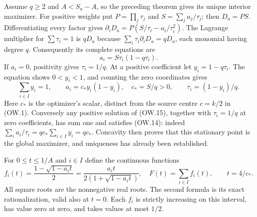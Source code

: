 Assume $q\ge2$ and $A<S_a-A$, so the preceding theorem gives its
unique interior maximizer. For positive weights put
$P=\prod_j\tau_j$ and $S=\sum_j a_j/\tau_j$; then $D_a=PS$.
Differentiating every factor gives
$\partial_iD_a=P(S/\tau_i-a_i/\tau_i^2)$.
The Lagrange multiplier for $\sum\tau_i=1$ is $qD_a$ because
$\sum_i\tau_i\partial_iD_a=qD_a$, each monomial having degree $q$.
Consequently its complete equations are
\[
 a_i=S\tau_i(1-q\tau_i).                                \tag{OW.14}
\]
If $a_i=0$, positivity gives $\tau_i=1/q$. At a positive
coefficient let $y_i=1-q\tau_i$. The equation shows
$0<y_i<1$, and counting the zero coordinates gives
\[
 \sum_{i\in I}y_i=1,\qquad
 a_i=c_*y_i(1-y_i),\quad c_*=S/q>0,\qquad
 \tau_i=(1-y_i)/q.                                       \tag{OW.15}
\]
Here $c_*$ is the optimizer's scalar, distinct from the source centre
$c=k/2$ in (OW.1). Conversely any positive solution of (OW.15),
together with $\tau_i=1/q$ at zero coefficients, has sum one and
satisfies (OW.14): indeed
$\sum_i a_i/\tau_i=q c_*\sum_{i\in I}y_i=q c_*$.
Concavity then proves that this stationary point is the global
maximizer, and uniqueness has already been established.

For $0\le t\le1/A$ and $i\in I$ define the continuous functions
\[
 f_i(t)=\frac{1-\sqrt{1-a_it}}2
       =\frac{a_it}{2(1+\sqrt{1-a_it})},\quad
 F(t)=\sum_{i\in I}f_i(t),\qquad t=4/c_*.
 \tag{OW.16}
\]
All square roots are the nonnegative real roots. The second formula
is its exact rationalization, valid also at $t=0$.
Each $f_i$ is strictly increasing on this interval, has value zero
at zero, and takes values at most $1/2$.

